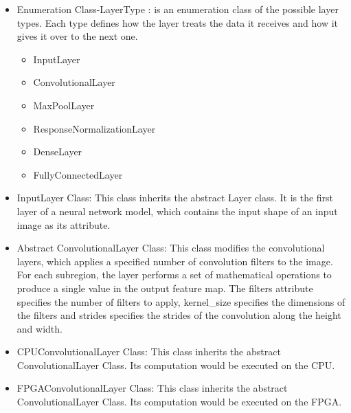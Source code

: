 \documentclass[parskip=full]{scrartcl}
\begin{document}
\pagebreak



\begin{itemize}
	\item Enumeration Class-LayerType : is an enumeration class of the possible layer types. Each type defines how the layer treats the data it receives and how it gives it over to the next one.
	\begin{itemize}
		\item InputLayer
		\item ConvolutionalLayer
		\item MaxPoolLayer
		\item ResponseNormalizationLayer
		\item DenseLayer
		\item FullyConnectedLayer
	\end{itemize}
	\item InputLayer Class: This class inherits the abstract Layer class. It is the first layer of a neural network model, which contains the input shape of an input image as its attribute.
	\item Abstract ConvolutionalLayer Class: This class modifies the convolutional layers, which applies a specified number of convolution filters to the image. For each subregion, the layer performs a set of mathematical operations to produce a single value in the output feature map. 
The filters attribute specifies the number of filters to apply, kernel\_size specifies the dimensions of the filters and strides specifies the strides of the convolution along the height and width.
	\item CPUConvolutionalLayer Class: This class inherits the abstract ConvolutionalLayer Class. Its computation would be executed on the CPU. 
	\item FPGAConvolutionalLayer Class: This class inherits the abstract ConvolutionalLayer Class. Its computation would be executed on the FPGA. 
\end{itemize}



\pagebreak
\end{document}
